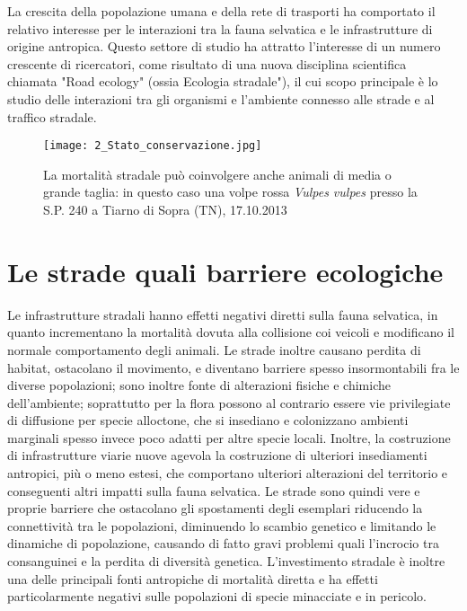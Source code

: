 \documentclass[11pt,a4paper,twoside]{memoir}
\begin{document}
La crescita della popolazione umana e della rete di trasporti ha comportato il relativo interesse per le interazioni tra la fauna selvatica e le infrastrutture di origine antropica. Questo settore di studio ha attratto l'interesse di un numero crescente di ricercatori, come risultato di una nuova disciplina scientifica chiamata "Road ecology" (ossia Ecologia stradale"), il cui scopo principale è lo studio delle interazioni tra gli organismi e l'ambiente connesso alle strade e al traffico stradale.
\newpage
\begin{figure}[H]
\label{fig:volpe_inv}
\centering
  \texttt{[image: 2\_Stato\_conservazione.jpg]}
\caption{La mortalità stradale può coinvolgere anche animali di media o grande taglia: in questo caso una volpe rossa \emph{Vulpes vulpes} presso la S.P. 240 a Tiarno di Sopra (TN), 17.10.2013}
\end{figure}

\section{Le strade quali barriere ecologiche}
\label{sec:intro_stradebarreco}
Le infrastrutture stradali hanno effetti negativi diretti sulla fauna selvatica, in quanto incrementano la mortalità dovuta alla collisione coi veicoli e modificano il normale comportamento degli animali. Le strade inoltre causano perdita di habitat, ostacolano il movimento, e diventano barriere spesso insormontabili fra le diverse popolazioni; sono inoltre fonte di alterazioni fisiche e chimiche dell'ambiente; soprattutto per la flora possono al contrario essere vie privilegiate di diffusione per specie alloctone, che si insediano e colonizzano ambienti marginali spesso invece poco adatti per altre specie locali. Inoltre, la costruzione di infrastrutture viarie nuove agevola la costruzione di ulteriori insediamenti antropici, più o meno estesi, che comportano ulteriori alterazioni del territorio e conseguenti altri impatti sulla fauna selvatica. Le strade sono quindi vere e proprie barriere che ostacolano gli spostamenti degli esemplari riducendo la connettività tra le popolazioni, diminuendo lo scambio genetico e limitando le dinamiche di popolazione, causando di fatto gravi problemi quali l’incrocio tra consanguinei e la perdita di diversità genetica. L’investimento stradale è inoltre una delle principali fonti antropiche di mortalità diretta e ha effetti particolarmente negativi sulle popolazioni di specie minacciate e in pericolo. 
\end{document}
